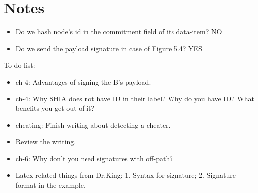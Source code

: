 \chapter{Notes}

\begin{itemize}
	\item Do we hash node's id in the commitment field of its data-item? NO
	\item Do we send the payload signature in case of Figure 5.4? YES
\end{itemize}

To do list:
\begin{itemize}
	\item ch-4: Advantages of signing the B's payload.
	\item ch-4: Why SHIA does not have ID in their label? Why do you have ID? What benefits you get out of it?
	\item cheating: Finish writing about detecting a cheater.
	\item Review the writing.

	\item ch-6: Why don't you need signatures with off-path?

	\item Latex related things from Dr.King: 1. Syntax for signature; 2. Signature format in the example.  	
\end{itemize}